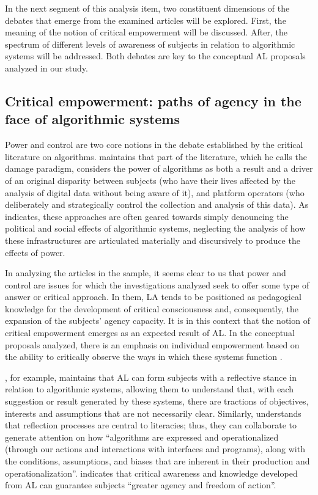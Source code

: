 In the next segment of this analysis item, two constituent dimensions of the debates that emerge from the examined articles will be explored. First, the meaning of the notion of critical empowerment will be discussed. After, the spectrum of different levels of awareness of subjects in relation to algorithmic systems will be addressed. Both debates are key to the conceptual AL proposals analyzed in our study.

\subsection{Critical empowerment: paths of agency in the face of algorithmic systems}\label{sub-sec-empoderamentocritico}

Power and control are two core notions in the debate established by the critical literature on algorithms. \textcite{Magalhaes2018} maintains that part of the literature, which he calls the damage paradigm, considers the power of algorithms as both a result and a driver of an original disparity between subjects (who have their lives affected by the analysis of digital data without being aware of it), and platform operators (who deliberately and strategically control the collection and analysis of this data). As \textcite{Rieder2018} indicates, these approaches are often geared towards simply denouncing the political and social effects of algorithmic systems, neglecting the analysis of how these infrastructures are articulated materially and discursively to produce the effects of power.

In analyzing the articles in the sample, it seems clear to us that power and control are issues for which the investigations analyzed seek to offer some type of answer or critical approach. In them, LA tends to be positioned as pedagogical knowledge for the development of critical consciousness and, consequently, the expansion of the subjects' agency capacity. It is in this context that the notion of critical empowerment emerges as an expected result of AL. In the conceptual proposals analyzed, there is an emphasis on individual empowerment based on the ability to critically observe the ways in which these systems function \cite{Bakke2020,Konig2022}.

\textcite{Konig2022}, for example, maintains that AL can form subjects with a reflective stance in relation to algorithmic systems, allowing them to understand that, with each suggestion or result generated by these systems, there are tractions of objectives, interests and assumptions that are not necessarily clear. Similarly, \textcite[p. 1483]{Lloyd2019} understands that reflection processes are central to literacies; thus, they can collaborate to generate attention on how “algorithms are expressed and operationalized (through our actions and interactions with interfaces and programs), along with the conditions, assumptions, and biases that are inherent in their production and operationalization”. \textcite[p. 177]{Sued2022} indicates that critical awareness and knowledge developed from AL can guarantee subjects “greater agency and freedom of action”.

